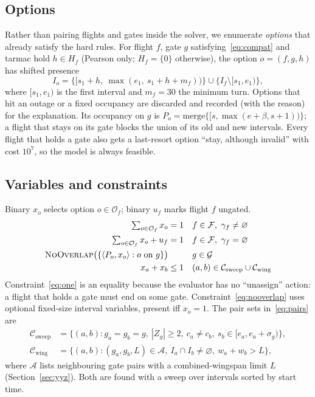 \documentclass[11pt]{article}
\theoremstyle{remark}
\newcommand{\G}{\mathcal{G}}
\newcommand{\F}{\mathcal{F}}
\newcommand{\Opt}{\mathcal{O}}
\begin{document}
\subsection{Options}
Rather than pairing flights and gates inside the solver, we enumerate \emph{options} that already
satisfy the hard rules. For flight $f$, gate $g$ satisfying~\eqref{eq:compat} and tarmac hold
$h\in H_f$ (Pearson only; $H_f=\{0\}$ otherwise), the option $o=(f,g,h)$ has shifted presence
\begin{equation}
I_o=\big\{[s_1+h,\ \max(e_1,\ s_1+h+m_f))\big\}\cup\{I_f\setminus[s_1,e_1)\},
\end{equation}
where $[s_1,e_1)$ is the first interval and $m_f=30$ the minimum turn. Options that hit an outage or
a fixed occupancy are discarded and recorded (with the reason) for the explanation. Its occupancy on
$g$ is $P_o=\mathrm{merge}\{[s,\max(e+\beta,s+1))\}$; a flight that stays on its gate blocks the union
of its old and new intervals. Every flight that holds a gate also gets a last-resort option ``stay,
although invalid'' with cost $10^7$, so the model is always feasible.

\subsection{Variables and constraints}
Binary $x_o$ selects option $o\in\Opt_f$; binary $u_f$ marks flight $f$ ungated.
\begin{align}
\textstyle\sum_{o\in\Opt_f}x_o &= 1 && f\in\F,\ \gamma_f\ne\varnothing \label{eq:one}\\
\textstyle\sum_{o\in\Opt_f}x_o + u_f &= 1 && f\in\F,\ \gamma_f=\varnothing \label{eq:atmost}\\
\textsc{NoOverlap}\big(\{\langle P_o, x_o\rangle : o \text{ on } g\}\big) &&& g\in\G \label{eq:nooverlap}\\
x_a+x_b &\le 1 && (a,b)\in\mathcal{C}_{\text{sweep}}\cup\mathcal{C}_{\text{wing}} \label{eq:pairs}
\end{align}
Constraint~\eqref{eq:one} is an equality because the evaluator has no ``unassign'' action: a flight
that holds a gate must end on some gate. Constraint~\eqref{eq:nooverlap} uses optional fixed-size
interval variables, present iff $x_o=1$. The pair sets in~\eqref{eq:pairs} are
\begin{align*}
\mathcal{C}_{\text{sweep}} &= \{(a,b): g_a=g_b=g,\ |Z_g|\ge2,\ c_a\ne c_b,\ s_b\in[e_a,e_a+\sigma_g)\},\\
\mathcal{C}_{\text{wing}} &= \{(a,b): (g_a,g_b,L)\in\mathcal{A},\ I_a\cap I_b\ne\varnothing,\ w_a+w_b>L\},
\end{align*}
where $\mathcal{A}$ lists neighbouring gate pairs with a combined-wingspan limit $L$
(Section~\ref{sec:yyz}). Both are found with a sweep over intervals sorted by start time.
\end{document}
